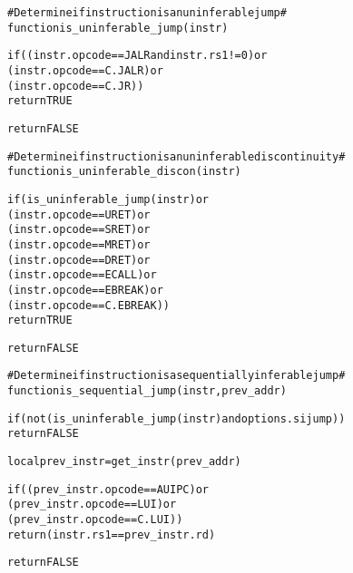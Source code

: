 \pagebreak

\begin{alltt}
# Determine if instruction is an uninferable jump #
function is_uninferable_jump (instr)

  if ((instr.opcode == JALR and instr.rs1 != 0) or
      (instr.opcode == C.JALR)                  or
      (instr.opcode == C.JR))
    return TRUE

  return FALSE

# Determine if instruction is an uninferable discontinuity #
function is_uninferable_discon (instr)

  if (is_uninferable_jump(instr) or
      (instr.opcode == URET)      or
      (instr.opcode == SRET)      or
      (instr.opcode == MRET)      or
      (instr.opcode == DRET)      or
      (instr.opcode == ECALL)     or
      (instr.opcode == EBREAK)    or
      (instr.opcode == C.EBREAK))
    return TRUE

  return FALSE

# Determine if instruction is a sequentially inferable jump #
function is_sequential_jump (instr, prev_addr)

  if (not (is_uninferable_jump(instr) and options.sijump))
    return FALSE

  local prev_instr = get_instr(prev_addr)

  if((prev_instr.opcode == AUIPC) or
     (prev_instr.opcode == LUI)   or
     (prev_instr.opcode == C.LUI))
    return (instr.rs1 == prev_instr.rd)

  return FALSE
\end{alltt}

\pagebreak

